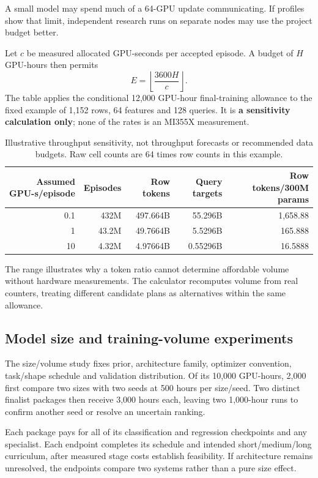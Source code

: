 \documentclass[11pt]{article}
\begin{document}
A small model may spend much of a 64-GPU update communicating. If profiles show that limit, independent research runs on separate nodes may use the project budget better.

Let $c$ be measured allocated GPU-seconds per accepted episode. A budget of $H$ GPU-hours then permits
\begin{equation}
E=\left\lfloor\frac{3600H}{c}\right\rfloor.
\end{equation}
The table applies the conditional 12,000 GPU-hour final-training allowance to the fixed example of 1,152 rows, 64 features and 128 queries. It is \textbf{a sensitivity calculation only}; none of the rates is an MI355X measurement.
\begin{table}[ht]
\centering\small
\begin{tabular}{@{}rrrrr@{}}
\toprule
Assumed GPU-s/episode & Episodes & Row tokens & Query targets & Row tokens/300M params\\
\midrule
0.1 & 432M & 497.664B & 55.296B & 1,658.88\\
1 & 43.2M & 49.7664B & 5.5296B & 165.888\\
10 & 4.32M & 4.97664B & 0.55296B & 16.5888\\
\bottomrule
\end{tabular}
\caption{Illustrative throughput sensitivity, not throughput forecasts or recommended data budgets. Raw cell counts are 64 times row counts in this example.}
\end{table}
The range illustrates why a token ratio cannot determine affordable volume without hardware measurements. The calculator recomputes volume from real counters, treating different candidate plans as alternatives within the same allowance.

\subsection{Model size and training-volume experiments}

The size/volume study fixes prior, architecture family, optimizer convention, task/shape schedule and validation distribution. Of its 10,000 GPU-hours, 2,000 first compare two sizes with two seeds at 500 hours per size/seed. Two distinct finalist packages then receive 3,000 hours each, leaving two 1,000-hour runs to confirm another seed or resolve an uncertain ranking.

Each package pays for all of its classification and regression checkpoints and any specialist. Each endpoint completes its schedule and intended short/medium/long curriculum, after measured stage costs establish feasibility. If architecture remains unresolved, the endpoints compare two systems rather than a pure size effect.
\end{document}
